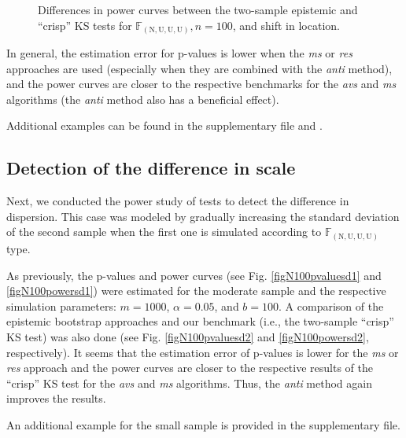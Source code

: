 \begin{figure}[htb]
\begin{minipage}[t]{0.45\linewidth}
	\caption{Differences in power curves between the two-sample epistemic and ``crisp'' KS tests for $\mathbb{F}_{(\mathrm{N,U,U,U})}, n=100$, and shift in location.}
	\label{figN100power2}
	\end{minipage}  
\end{figure}

In general, the estimation error for p-values is lower when the \emph{ms} or \emph{res} approaches are used (especially when they are combined with the \emph{anti} method), and the power curves are closer to the respective benchmarks for the \emph{avs} and \emph{ms} algorithms (the \emph{anti} method also has a beneficial effect).

Additional examples can be found in the supplementary file and \cite{10.1007/978-3-031-08974-9_39}.




\subsection{Detection of the difference in scale}

Next, we conducted the power study of tests to detect the difference in dispersion.
This case was modeled by gradually increasing the standard deviation of the second sample when the first one is simulated according to $\mathbb{F}_{(\mathrm{N,U,U,U})}$ type.

As previously, the p-values and power curves (see Fig. \ref{figN100pvaluesd1} and \ref{figN100powersd1}) were estimated for the moderate sample and the respective simulation parameters: $m=1000$, $\alpha=0.05$, and $b=100$.
A comparison of the epistemic bootstrap approaches and our benchmark (i.e., the two-sample ``crisp'' KS test) was also done (see Fig. \ref{figN100pvaluesd2} and \ref{figN100powersd2}, respectively).
It seems that the estimation error of p-values is lower for the \emph{ms} or \emph{res} approach and the power curves are closer to the respective results of the ``crisp'' KS test for the \emph{avs} and \emph{ms} algorithms. Thus, the \emph{anti} method again improves the results.

An additional example for the small sample is provided in the supplementary file.


